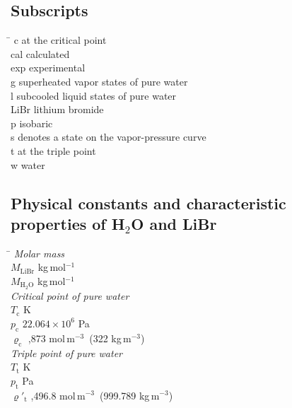 \documentclass[11pt]{article}
\newcommand{\dens}{\varrho}
\newcommand{\molm}{mol\,m$^{-3}$}
\begin{document}
\subsection*{Subscripts}
\begin{tabbing}
\hspace{1.4cm}\= \kill
c    \> at the critical point \\
cal  \> calculated \\
exp  \> experimental \\
g    \> superheated vapor states of pure water \\
l    \> subcooled liquid states of pure water \\
LiBr \> lithium bromide \\
p    \> isobaric \\
s    \> denotes a state on the vapor-pressure curve \\
t    \> at the triple point \\
w    \> water
\end{tabbing}

\subsection*{Physical constants and characteristic properties of
             H$_2$O and LiBr}
\begin{tabbing}
\hspace{2.4cm}\= \kill
\textit{Molar mass} \> \\
$M_\mathrm{LiBr}$  kg\,mol$^{-1}$ \\
$M_{\mathrm{H_2O}}$  kg\,mol$^{-1}$ \\[4pt]
\textit{Critical point of pure water} \> \\
$T_\mathrm{c}$  K \\
$p_\mathrm{c}$ \> $22.064\times10^{6}$ Pa \\
$\dens_\mathrm{c}$ ,873 \molm\ (322 kg\,m$^{-3}$) \\[4pt]
\textit{Triple point of pure water} \> \\
$T_\mathrm{t}$  K \\
$p_\mathrm{t}$  Pa \\
$\dens'_\mathrm{t}$ ,496.8 \molm\ (999.789 kg\,m$^{-3}$)
\end{tabbing}

\end{document}

